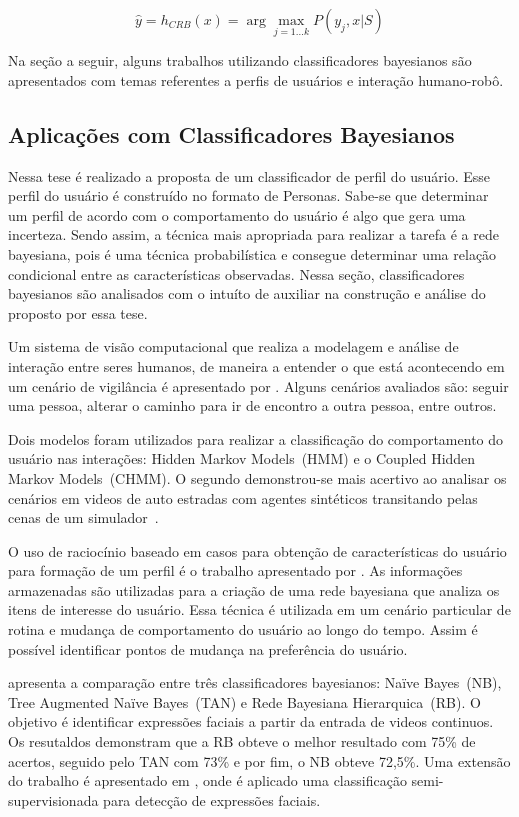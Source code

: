 \begin{equation}
    \label{eq:crb}
    \hat{y} = h_{CRB}(x) = \arg \max_{j=1 \dots k} P(y_j, x | S)
\end{equation}

Na seção a seguir, alguns trabalhos utilizando classificadores bayesianos são apresentados com temas referentes a perfis de usuários e interação humano-robô.

\subsection{Aplicações com Classificadores Bayesianos}
\label{sec:cbrw}
Nessa tese é realizado a proposta de um classificador de perfil do usuário. Esse perfil do usuário é construído no formato de Personas. Sabe-se que determinar um perfil de acordo com o comportamento do usuário é algo que gera uma incerteza. Sendo assim, a técnica mais apropriada para realizar a tarefa é a rede bayesiana, pois é uma técnica probabilística e consegue determinar uma relação condicional entre as características observadas. Nessa seção, classificadores bayesianos são analisados com o intuíto de auxiliar na construção e análise do proposto por essa tese.

Um sistema de visão computacional que realiza a modelagem e análise de interação entre seres humanos, de maneira a entender o que está acontecendo em um cenário de vigilância é apresentado por . Alguns cenários avaliados são: seguir uma pessoa, alterar o caminho para ir de encontro a outra pessoa, entre outros.

Dois modelos foram utilizados para realizar a classificação do comportamento do usuário nas interações: Hidden Markov Models~(HMM) e o Coupled Hidden Markov Models~(CHMM). O segundo demonstrou-se mais acertivo ao analisar os cenários em videos de auto estradas com agentes sintéticos transitando pelas cenas de um simulador~\cite{oliver:2000}.

O uso de raciocínio baseado em casos para obtenção de características do usuário para formação de um perfil é o trabalho apresentado por . As informações armazenadas são utilizadas para a criação de uma rede bayesiana que analiza os itens de interesse do usuário. Essa técnica é utilizada em um cenário particular de rotina e mudança de comportamento do usuário ao longo do tempo. Assim é possível identificar pontos de mudança na preferência do usuário.

 apresenta a comparação entre três classificadores bayesianos: Naïve Bayes~(NB), Tree Augmented Naïve Bayes~(TAN) e Rede Bayesiana Hierarquica~(RB). O objetivo é identificar expressões faciais a partir da entrada de videos continuos. Os resutaldos demonstram que a RB obteve o melhor resultado com 75\% de acertos, seguido pelo TAN com 73\% e por fim, o NB obteve 72,5\%. Uma extensão do trabalho é apresentado em , onde é aplicado uma classificação semi-supervisionada para detecção de expressões faciais.

